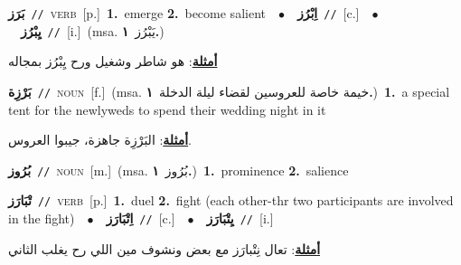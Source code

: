 \documentclass[10pt,a4paper,twoside]{article} %
\begin{document}
\begin{multicols}{2}
{\setlength\topsep{0pt}\textbf{\foreignlanguage{arabic}{بَرَز}}\ {\color{gray}\texttt{//}\color{black}}\ \textsc{verb}\ [p.]\ \textbf{1.}~emerge  \textbf{2.}~become salient\ \ $\bullet$\ \ \setlength\topsep{0pt}\textbf{\foreignlanguage{arabic}{اِبْرُز}}\ {\color{gray}\texttt{//}\color{black}}\ [c.]\ \ $\bullet$\ \ \setlength\topsep{0pt}\textbf{\foreignlanguage{arabic}{يِبْرُز}}\ {\color{gray}\texttt{//}\color{black}}\ [i.]\ \color{gray}(msa. \foreignlanguage{arabic}{يَبْرُز}~\foreignlanguage{arabic}{\textbf{١.}})\color{black}\  \begin{flushright}\color{gray}\foreignlanguage{arabic}{\textbf{\underline{\foreignlanguage{arabic}{أمثلة}}}: هو شاطر وشغيل ورح يِبْرُز بمجاله}\end{flushright}\color{black}} \vspace{2mm}

{\setlength\topsep{0pt}\textbf{\foreignlanguage{arabic}{بَرْزِة}}\ {\color{gray}\texttt{//}\color{black}}\ \textsc{noun}\ [f.]\ \color{gray}(msa. \foreignlanguage{arabic}{خيمة خاصة للعروسين لقضاء ليلة الدخلة}~\foreignlanguage{arabic}{\textbf{١.}})\color{black}\ \textbf{1.}~a special tent for the newlyweds to spend their wedding night in it\  \begin{flushright}\color{gray}\foreignlanguage{arabic}{\textbf{\underline{\foreignlanguage{arabic}{أمثلة}}}: البَرْزِة جاهزة، جيبوا العروس.}\end{flushright}\color{black}} \vspace{2mm}

{\setlength\topsep{0pt}\textbf{\foreignlanguage{arabic}{بُرُوز}}\ {\color{gray}\texttt{//}\color{black}}\ \textsc{noun}\ [m.]\ \color{gray}(msa. \foreignlanguage{arabic}{بُرُوز}~\foreignlanguage{arabic}{\textbf{١.}})\color{black}\ \textbf{1.}~prominence  \textbf{2.}~salience\ } \vspace{2mm}

{\setlength\topsep{0pt}\textbf{\foreignlanguage{arabic}{تْبَارَز}}\ {\color{gray}\texttt{//}\color{black}}\ \textsc{verb}\ [p.]\ \textbf{1.}~duel  \textbf{2.}~fight (each other-thr two participants are involved in the fight)\ \ $\bullet$\ \ \setlength\topsep{0pt}\textbf{\foreignlanguage{arabic}{اِتْبَارَز}}\ {\color{gray}\texttt{//}\color{black}}\ [c.]\ \ $\bullet$\ \ \setlength\topsep{0pt}\textbf{\foreignlanguage{arabic}{يِتْبَارَز}}\ {\color{gray}\texttt{//}\color{black}}\ [i.]\  \begin{flushright}\color{gray}\foreignlanguage{arabic}{\textbf{\underline{\foreignlanguage{arabic}{أمثلة}}}: تعال نِتْبارَز مع بعض ونشوف مين اللي رح يغلب الثاني}\end{flushright}\color{black}} \vspace{2mm}


\end{multicols}
\end{document}
